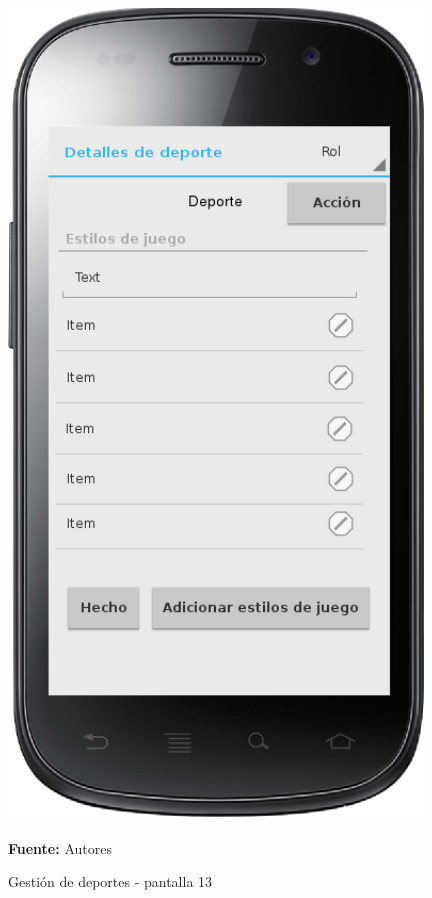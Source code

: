 \begin{figure}[!htb]
  \begin{center}
    \includegraphics[width=11cm]{./imagenes/UI/Deportes/gestion_deportes_13.png}
    \caption{Gestión de deportes - pantalla 13}
    \label{fig:gestion_deportes_13}
    \textbf{Fuente:}  Autores
  \end{center}
\end{figure}

